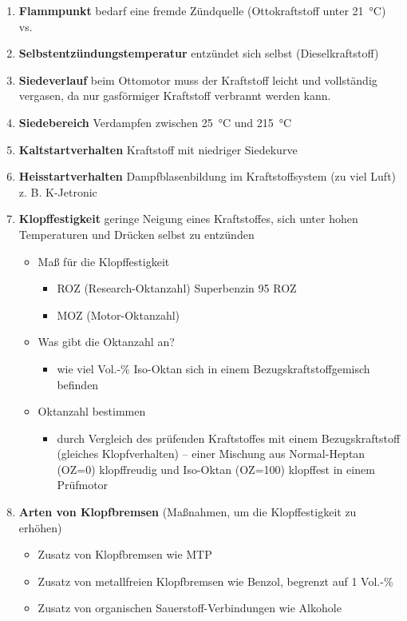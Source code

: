 \begin{enumerate}
\item
  \textbf{Flammpunkt} bedarf eine fremde Zündquelle (Ottokraftstoff
  unter 21~°C) vs.~
\item
  \textbf{Selbstentzündungstemperatur} entzündet sich selbst
  (Dieselkraftstoff)
\item
  \textbf{Siedeverlauf} beim Ottomotor muss der Kraftstoff leicht und
  vollständig vergasen, da nur gasförmiger Kraftstoff verbrannt werden
  kann.
\item
  \textbf{Siedebereich} Verdampfen zwischen 25~°C und 215~°C
\item
  \textbf{Kaltstartverhalten} Kraftstoff mit niedriger Siedekurve
\item
  \textbf{Heisstartverhalten} Dampfblasenbildung im Kraftstoffsystem (zu
  viel Luft) z. B. K-Jetronic
\item
  \textbf{Klopffestigkeit} geringe Neigung eines Kraftstoffes, sich
  unter hohen Temperaturen und Drücken selbst zu entzünden

  \begin{itemize}
  \item
    Maß für die Klopffestigkeit

    \begin{itemize}
    \item
      ROZ (Research-Oktanzahl) Superbenzin 95 ROZ
    \item
      MOZ (Motor-Oktanzahl)
    \end{itemize}
  \item
    Was gibt die Oktanzahl an?

    \begin{itemize}
    \item
      wie viel Vol.-\% Iso-Oktan sich in einem Bezugskraftstoffgemisch
      befinden
    \end{itemize}
  \item
    Oktanzahl bestimmen

    \begin{itemize}
    \item
      durch Vergleich des prüfenden Kraftstoffes mit einem
      Bezugskraftstoff (gleiches Klopfverhalten) -- einer Mischung aus
      Normal-Heptan (OZ=0) klopffreudig und Iso-Oktan (OZ=100) klopffest
      in einem Prüfmotor
    \end{itemize}
  \end{itemize}
\item
  \textbf{Arten von Klopfbremsen} (Maßnahmen, um die Klopffestigkeit zu
  erhöhen)

  \begin{itemize}
  \item
    Zusatz von Klopfbremsen wie MTP
  \item
    Zusatz von metallfreien Klopfbremsen wie Benzol, begrenzt auf 1
    Vol.-\%
  \item
    Zusatz von organischen Sauerstoff-Verbindungen wie Alkohole
  \end{itemize}
\end{enumerate}
